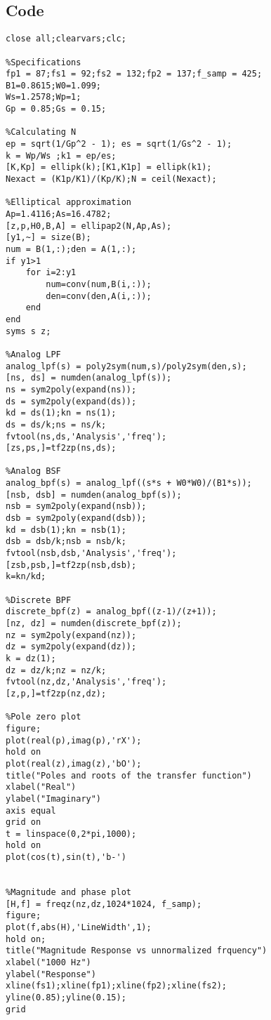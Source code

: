 \documentclass[12pt]{article}
\begin{document}
\subsection{Code}
\begin{verbatim}
close all;clearvars;clc;

%Specifications
fp1 = 87;fs1 = 92;fs2 = 132;fp2 = 137;f_samp = 425;
B1=0.8615;W0=1.099;
Ws=1.2578;Wp=1;
Gp = 0.85;Gs = 0.15;

%Calculating N
ep = sqrt(1/Gp^2 - 1); es = sqrt(1/Gs^2 - 1);
k = Wp/Ws ;k1 = ep/es;
[K,Kp] = ellipk(k);[K1,K1p] = ellipk(k1);
Nexact = (K1p/K1)/(Kp/K);N = ceil(Nexact); 

%Elliptical approximation
Ap=1.4116;As=16.4782;
[z,p,H0,B,A] = ellipap2(N,Ap,As);
[y1,~] = size(B);
num = B(1,:);den = A(1,:);
if y1>1
    for i=2:y1
        num=conv(num,B(i,:));
        den=conv(den,A(i,:));
    end
end
syms s z;

%Analog LPF
analog_lpf(s) = poly2sym(num,s)/poly2sym(den,s);  
[ns, ds] = numden(analog_lpf(s));                                        
ns = sym2poly(expand(ns));
ds = sym2poly(expand(ds));                             
kd = ds(1);kn = ns(1);    
ds = ds/k;ns = ns/k;
fvtool(ns,ds,'Analysis','freq');                       
[zs,ps,]=tf2zp(ns,ds);

%Analog BSF
analog_bpf(s) = analog_lpf((s*s + W0*W0)/(B1*s));   
[nsb, dsb] = numden(analog_bpf(s));                                        
nsb = sym2poly(expand(nsb));
dsb = sym2poly(expand(dsb));                             
kd = dsb(1);kn = nsb(1);    
dsb = dsb/k;nsb = nsb/k;
fvtool(nsb,dsb,'Analysis','freq');                       
[zsb,psb,]=tf2zp(nsb,dsb);
k=kn/kd;

%Discrete BPF
discrete_bpf(z) = analog_bpf((z-1)/(z+1));              
[nz, dz] = numden(discrete_bpf(z));                                        
nz = sym2poly(expand(nz));
dz = sym2poly(expand(dz));                             
k = dz(1);    
dz = dz/k;nz = nz/k;
fvtool(nz,dz,'Analysis','freq');                       
[z,p,]=tf2zp(nz,dz);

%Pole zero plot
figure;
plot(real(p),imag(p),'rX');
hold on
plot(real(z),imag(z),'bO');
title("Poles and roots of the transfer function")
xlabel("Real")
ylabel("Imaginary")
axis equal
grid on
t = linspace(0,2*pi,1000);
hold on
plot(cos(t),sin(t),'b-') 


%Magnitude and phase plot
[H,f] = freqz(nz,dz,1024*1024, f_samp);
figure;
plot(f,abs(H),'LineWidth',1);
hold on;
title("Magnitude Response vs unnormalized frquency")
xlabel("1000 Hz")
ylabel("Response")
xline(fs1);xline(fp1);xline(fp2);xline(fs2);
yline(0.85);yline(0.15);
grid
\end{verbatim}
\end{document}
